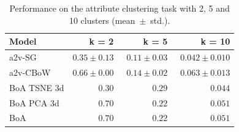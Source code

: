 \begin{table}[t]
\caption{Performance on the attribute clustering task with 2, 5 and 10 clusters (mean~$\pm$~std.).} %
\label{tab:attribute}
\centering
\begin{tabular}{lrrr}
\toprule
Model              & k = 2 & k = 5 & k = 10 \\
\midrule
a2v-SG             & $0.35 \pm 0.13$ &  $0.11 \pm 0.03$ & $0.042 \pm 0.010$ \\
a2v-CBoW           & $0.66 \pm 0.00$ &  ~$0.14 \pm 0.02$ & ~${0.063 \pm 0.013}$ \\
\midrule
BoA TSNE 3d & $0.30$ & $0.29$ & $0.044$ \\
BoA PCA 3d  & ${0.70}$ & ${0.22}$ & $0.051$ \\
BoA         & ${0.70}$ & ${0.22}$ & $0.051$ \\
\bottomrule
\end{tabular}
\end{table}

